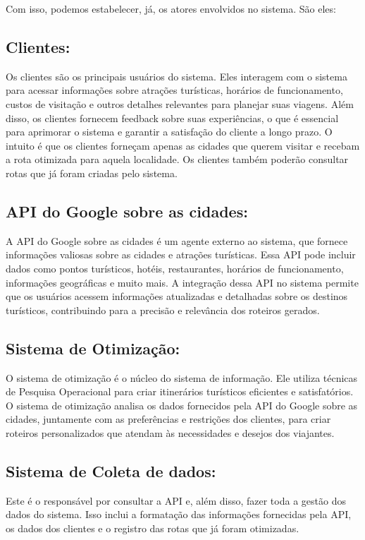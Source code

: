 Com isso, podemos estabelecer, já, os atores envolvidos no sistema. São eles:

\subsection{Clientes:} 
Os clientes são os principais usuários do sistema. Eles interagem com o sistema para acessar informações sobre atrações turísticas, horários de funcionamento, custos de visitação e outros detalhes relevantes para planejar suas viagens. Além disso, os clientes fornecem feedback sobre suas experiências, o que é essencial para aprimorar o sistema e garantir a satisfação do cliente a longo prazo. O intuito é que os clientes forneçam apenas as cidades que querem visitar e recebam a rota otimizada para aquela localidade. Os clientes também poderão consultar rotas que já foram criadas pelo sistema.

\subsection{API do Google sobre as cidades:} 
A API do Google sobre as cidades é um agente externo ao sistema, que fornece informações valiosas sobre as cidades e atrações turísticas. Essa API pode incluir dados como pontos turísticos, hotéis, restaurantes, horários de funcionamento, informações geográficas e muito mais. A integração dessa API no sistema permite que os usuários acessem informações atualizadas e detalhadas sobre os destinos turísticos, contribuindo para a precisão e relevância dos roteiros gerados.

\subsection{Sistema de Otimização:} 
O sistema de otimização é o núcleo do sistema de informação. Ele utiliza técnicas de Pesquisa Operacional para criar itinerários turísticos eficientes e satisfatórios. O sistema de otimização analisa os dados fornecidos pela API do Google sobre as cidades, juntamente com as preferências e restrições dos clientes, para criar roteiros personalizados que atendam às necessidades e desejos dos viajantes.

\subsection{Sistema de Coleta de dados:} 
Este é o responsável por consultar a API e, além disso, fazer toda a gestão dos dados do sistema. Isso inclui a formatação das informações fornecidas pela API, os dados dos clientes e o registro das rotas que já foram otimizadas.

